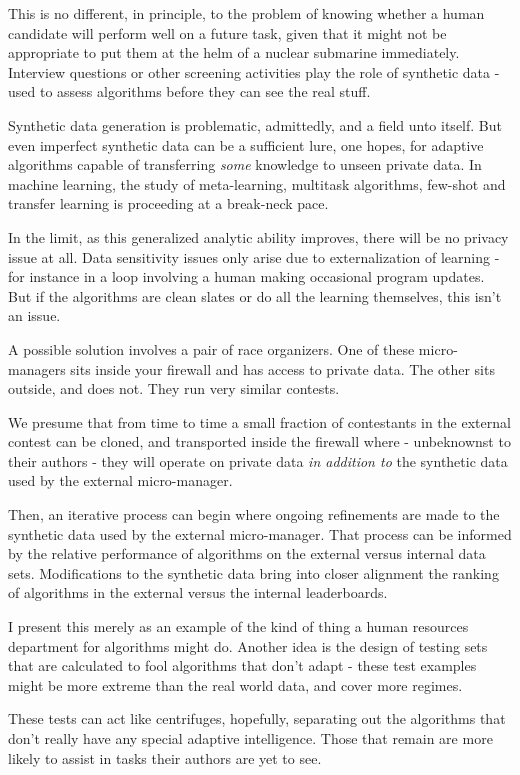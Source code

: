 This is no different, in principle, to the problem of knowing whether a human candidate will perform well on a future task, given that it might not be appropriate to put them at the helm of a nuclear submarine immediately. Interview questions or other screening activities play the role of synthetic data - used to assess algorithms before they can see the real stuff.  

Synthetic data generation is problematic, admittedly, and a field unto itself. But even imperfect synthetic data can be a sufficient lure, one hopes, for adaptive algorithms capable of transferring {\em some} knowledge to unseen private data. In machine learning, the study of meta-learning, multitask algorithms, few-shot and transfer learning is proceeding at a break-neck pace. 

In the limit, as this generalized analytic ability improves, there will be no privacy issue at all. Data sensitivity issues only arise due to externalization of learning - for instance in a loop involving a human making occasional program updates. But if the algorithms are clean slates or do all the learning themselves, this isn't an issue. 


A possible solution involves a pair of race organizers. One of these micro-managers sits inside your firewall and has access to private data. The other sits outside, and does not. They run very similar contests.  


We presume that from time to time a small fraction of contestants in the external contest can be cloned, and transported inside the firewall where - unbeknownst to their authors - they will operate on private data {\em in addition to} the synthetic data used by the external micro-manager.  


Then, an iterative process can begin where ongoing refinements are made to the synthetic data used by the external micro-manager. That process can be informed by the relative performance of algorithms on the external versus internal data sets. Modifications to the synthetic data bring into closer alignment the ranking of algorithms in the external versus the internal leaderboards.  

I present this merely as an example of the kind of thing a human resources department for algorithms might do. Another idea is the design of testing sets that are calculated to fool algorithms that don't adapt - these test examples might be more extreme than the real world data, and cover more regimes.  

These tests can act like centrifuges, hopefully, separating out the algorithms that don't really have any special adaptive intelligence. Those that remain are more likely to assist in tasks their authors are yet to see. 



